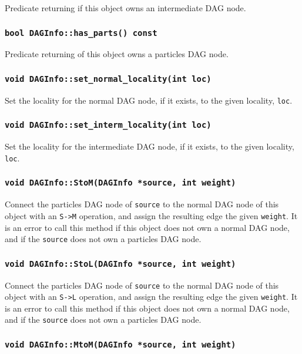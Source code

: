 Predicate returning if this object owns an intermediate DAG node.

\subsubsection{\texttt{bool DAGInfo::has\_parts() const}}

Predicate returning of this object owns a particles DAG node.

\subsubsection{\texttt{void DAGInfo::set\_normal\_locality(int loc)}}

Set the locality for the normal DAG node, if it exists, to the given
locality, \texttt{loc}.

\subsubsection{\texttt{void DAGInfo::set\_interm\_locality(int loc)}}

Set the locality for the intermediate DAG node, if it exists, to the given
locality, \texttt{loc}.

\subsubsection{\texttt{void DAGInfo::StoM(DAGInfo *source, int weight)}}

Connect the particles DAG node of \texttt{source} to the normal DAG node of
this object with an \texttt{S->M} operation, and assign the resulting edge the
given \texttt{weight}. It is an error to call this method if this object does
not own a normal DAG node, and if the \texttt{source} does not own a particles
DAG node.

\subsubsection{\texttt{void DAGInfo::StoL(DAGInfo *source, int weight)}}

Connect the particles DAG node of \texttt{source} to the normal DAG node of
this object with an \texttt{S->L} operation, and assign the resulting edge the
given \texttt{weight}. It is an error to call this method if this object does
not own a normal DAG node, and if the \texttt{source} does not own a particles
DAG node.

\subsubsection{\texttt{void DAGInfo::MtoM(DAGInfo *source, int weight)}}

